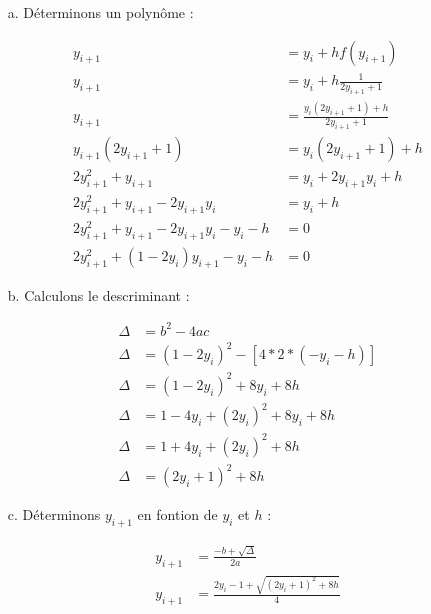 \documentclass[12pt, letterpaper]{article}
\begin{document}
\begin{enumerate}
\begin{enumerate}
\item[a.] Déterminons un polynôme :

  \begin{equation*}
    \begin{split}
      y_{i+1} & = y_i + h f(y_{i+1}) \\
      y_{i+1} & = y_i + h \frac{1}{2y_{i+1} + 1} \\
      y_{i+1} & = \frac{y_i (2y_{i+1} + 1) + h}{2y_{i+1} + 1} \\
      y_{i+1} (2y_{i+1} + 1) & = y_i (2y_{i+1} + 1) + h \\
      2y_{i+1}^2 + y_{i+1} & = y_i + 2y_{i+1}y_i + h \\
      2y_{i+1}^2 + y_{i+1} - 2y_{i+1}y_i & = y_i + h \\
      2y_{i+1}^2 + y_{i+1} - 2y_{i+1}y_i - y_i - h & = 0 \\
      2y_{i+1}^2 + (1 - 2y_i) y_{i+1} - y_i - h & = 0
    \end{split}
  \end{equation*}

\item[b.] Calculons le descriminant :

    \begin{equation*}
    \begin{split}
      \Delta & = b^2 - 4ac \\
      \Delta & = (1 - 2y_i)^2 - [4 * 2 * (- y_i - h)] \\
      \Delta & = (1 - 2y_i)^2 + 8y_i + 8h \\
      \Delta & = 1 - 4y_i + (2y_i)^2 + 8y_i + 8h \\
      \Delta & = 1 + 4y_i + (2y_i)^2 + 8h \\
      \Delta & = (2y_i + 1)^2 + 8h
    \end{split}
  \end{equation*}

\item[c.] Déterminons $y_{i+1}$ en fontion de $y_i$ et $h$ :

  \begin{equation*}
    \begin{split}
      y_{i+1} & = \frac{- b + \sqrt{\Delta}}{2a} \\
      y_{i+1} & = \frac{2y_i - 1 + \sqrt{(2y_i + 1)^2 + 8h}}{4} 
    \end{split}
  \end{equation*}


\end{enumerate}
\end{enumerate}
\end{document}

